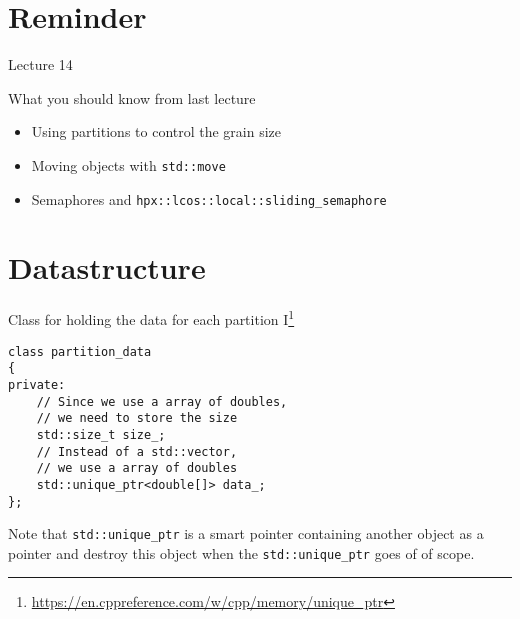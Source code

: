 \documentclass[\classoption]{beamer}
\title{\coursename}
\subtitle{Lecture 15: Parallel partition-based 1D heat equation }
\author{\tiny Patrick Diehl \orcid{0000-0003-3922-8419}}
\date {
 \tiny \url{\courseurl}
\vspace{2cm}
\doclicenseThis  
  
}
\begin{document}
 {
    \frame {
        \titlepage
    }
}

\frame{

\tableofcontents

}


\section{Reminder}
\begin{frame}{Lecture 14}
\begin{block}{What you should know from last lecture}
\begin{itemize}
\item Using partitions to control the grain size
\item Moving objects with \lstinline|std::move|
\item Semaphores and \lstinline|hpx::lcos::local::sliding_semaphore|
\end{itemize}
\end{block}
\end{frame}

\section{Datastructure}

\begin{frame}[fragile]{Class for holding the data for each partition I\footnote{\tiny\url{https://en.cppreference.com/w/cpp/memory/unique_ptr}}}

\begin{lstlisting}
class partition_data
{
private:
    // Since we use a array of doubles, 
    // we need to store the size 
    std::size_t size_;
    // Instead of a std::vector, 
    // we use a array of doubles 
    std::unique_ptr<double[]> data_;
};
\end{lstlisting}

Note that \lstinline|std::unique_ptr| is a smart pointer containing another object as a pointer and destroy this object when the \lstinline|std::unique_ptr| goes of of scope.

\end{frame}
\end{document}
